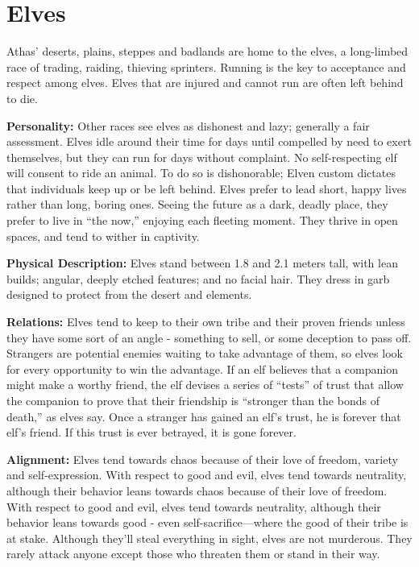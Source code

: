 \section{Elves}

Athas' deserts, plains, steppes and badlands are home to the elves, a long-limbed race of trading, raiding, thieving sprinters. Running is the key to acceptance and respect among elves. Elves that are injured and cannot run are often left behind to die.

\textbf{Personality:} Other races see elves as dishonest and lazy; generally a fair assessment. Elves idle around their time for days until compelled by need to exert themselves, but they can run for days without complaint. No self-respecting elf will consent to ride an animal. To do so is dishonorable; Elven custom dictates that individuals keep up or be left behind. Elves prefer to lead short, happy lives rather than long, boring ones. Seeing the future as a dark, deadly place, they prefer to live in ``the now,'' enjoying each fleeting moment. They thrive in open spaces, and tend to wither in captivity.

\textbf{Physical Description:} Elves stand between 1.8 and 2.1 meters tall, with lean builds; angular, deeply etched features; and no facial hair. They dress in garb designed to protect from the desert and elements.

\textbf{Relations:} Elves tend to keep to their own tribe and their proven friends unless they have some sort of an angle - something to sell, or some deception to pass off. Strangers are potential enemies waiting to take advantage of them, so elves look for every opportunity to win the advantage. If an elf believes that a companion might make a worthy friend, the elf devises a series of ``tests'' of trust that allow the companion to prove that their friendship is ``stronger than the bonds of death,'' as elves say. Once a stranger has gained an elf's trust, he is forever that elf's friend. If this trust is ever betrayed, it is gone forever.

\textbf{Alignment:} Elves tend towards chaos because of their love of freedom, variety and self-expression. With respect to good and evil, elves tend towards neutrality, although their behavior leans towards chaos because of their love of freedom. With respect to good and evil, elves tend towards neutrality, although their behavior leans towards good - even self-sacrifice---where the good of their tribe is at stake. Although they'll steal everything in sight, elves are not murderous. They rarely attack anyone except those who threaten them or stand in their way.

